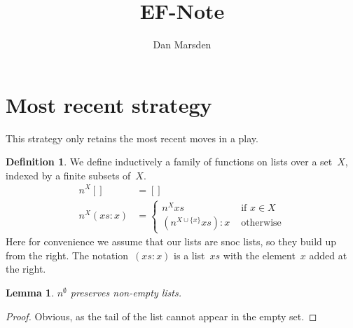\documentclass{article}
\title{EF-Note}
\author{Dan Marsden}
\theoremstyle{plain}
\newtheorem{lemma}[theorem]{Lemma}
\theoremstyle{definition}
\newtheorem{definition}[theorem]{Definition}
\theoremstyle{remark}
\numberwithin{theorem}{section}
\begin{document}
\maketitle

\section{Most recent strategy}
This strategy only retains the most recent moves in a play.
\begin{definition}
We define inductively a family of functions on lists over a set~$X$, indexed by a finite subsets of~$X$.
\begin{align*}
    n^X [] &= []\\
    n^X (xs:x) &= 
    \begin{cases}
    n^X xs &\mbox{ if } x \in X\\
    (n^{X \cup \{ x \} }xs) : x &\mbox{ otherwise}
    \end{cases}
\end{align*}
Here for convenience we assume that our lists are snoc lists, so they build up from the right. The notation~$(xs:x)$ is a list~$xs$ with the element~$x$ added at the right.
\end{definition}
\begin{lemma}
$n^\emptyset$ preserves non-empty lists.
\end{lemma}
\begin{proof}
Obvious, as the tail of the list cannot appear in the empty set.
\end{proof}
\end{document}
